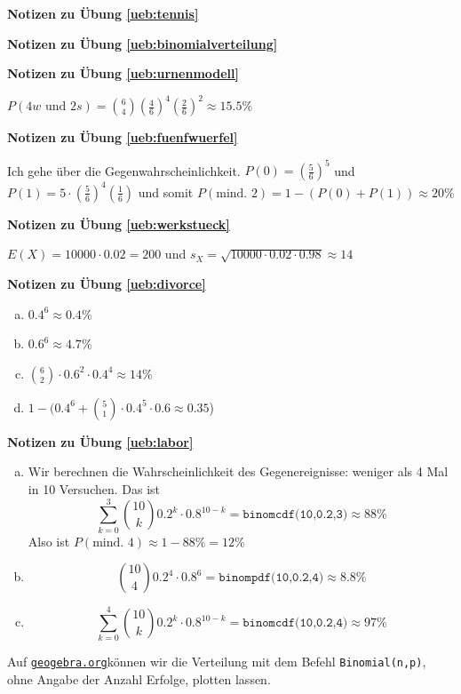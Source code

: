 \documentclass[%
<<<<<<< Updated upstream
11pt,%
twoside,%
titlepage,%
german,%
=======
11pt,%
twoside,%
titlepage,%
swissgerman,%
>>>>>>> Stashed changes
headsepline%
]{scrartcl}
\newcommand{\faReturnGray}{\textcolor{gray}{\faMailReply}} %
\newcommand{\geogebralink}{\href{https://www.geogebra.org/calculator}{\texttt{geogebra.org}}}
\newcommand{\geogebralink}{\href{https://www.geogebra.org/calculator}{\texttt{geogebra.org}}}
\theoremstyle{definition}
\theoremstyle{plain}
\newcommand{\concatueb}[1]{ueb:#1}%
\newcommand{\concatlsg}[1]{lsg:#1}%
\newenvironment{lsg}[1]{%
    \par\noindent\textbf{Notizen zu Übung \ref{\concatueb{#1}}}\label{\concatlsg{#1}}
    \hfill\hyperref[\concatueb{#1}]{\faReturnGray}\par %
}{%
    \par%
}
\newcommand{\concatueb}[1]{ueb:#1}%
\newcommand{\concatlsg}[1]{lsg:#1}%
\newenvironment{lsg}[1]{%
    \par\noindent\textbf{Notizen zu Übung \ref{\concatueb{#1}}.}%
    \label{\concatlsg{#1}}
}{%
    \par%
}
\begin{document}
\begin{lsg}{tennis}
\begin{lsg}{binomialverteilung}
\end{lsg}
\begin{lsg}{urnenmodell}
    $P(4w\text{ und }2s)=\binom{6}{4}(\frac{4}{6})^4(\frac{2}{6})^2\approx15.5\%$
\end{lsg}
\begin{lsg}{fuenfwuerfel}
    Ich gehe über die Gegenwahrscheinlichkeit. $P(0)=(\frac{5}{6})^5$ und $P(1)=5\cdot(\frac{5}{6})^4(\frac{1}{6})$ und somit $P(\text{mind. }2)=1-(P(0)+P(1))\approx20\%$
\end{lsg}
\begin{lsg}{werkstueck}
    $E(X)=10000\cdot0.02=200$ und $s_X=\sqrt{10000\cdot0.02\cdot0.98}\approx14$
\end{lsg}
\begin{lsg}{divorce}
    \begin{enumerate}[a)]
        \item $0.4^6\approx0.4\%$
        \item $0.6^6\approx4.7\%$
        \item $\binom{6}{2}\cdot0.6^2\cdot0.4^4\approx14\%$
        \item $1-(0.4^6+\binom{5}{1}\cdot0.4^5\cdot0.6\approx0.35$)
    \end{enumerate}
\end{lsg}
\begin{lsg}{labor}
    \begin{enumerate}[a)]
        \item Wir berechnen die Wahrscheinlichkeit des Gegenereignisse: weniger als 4 Mal in 10 Versuchen. Das ist
        $$\sum_{k=0}^3\binom{10}{k}0.2^k\cdot0.8^{10-k}=\texttt{binomcdf(10,0.2,3)}\approx88\%$$
        Also ist $P(\text{mind. 4})\approx1-88\%=12\%$
        \item $$\binom{10}{4}0.2^4\cdot0.8^6=\texttt{binompdf(10,0.2,4)}\approx8.8\%$$
        \item $$\sum_{k=0}^4\binom{10}{k}0.2^k\cdot0.8^{10-k}=\texttt{binomcdf(10,0.2,4)}\approx97\%$$
    \end{enumerate}
    Auf \geogebralink können wir die Verteilung mit dem Befehl \texttt{Binomial(n,p)}, ohne Angabe der Anzahl Erfolge, plotten lassen.

\begin{center}
\end{center}
\end{lsg}
\end{lsg}
\end{document}
